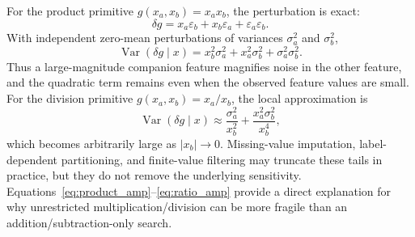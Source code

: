 \documentclass[preprint,12pt]{elsarticle}
\begin{document}
For the product primitive $g(x_a,x_b)=x_a x_b$, the perturbation is exact:
\begin{equation}
  \delta g=x_a\varepsilon_b+x_b\varepsilon_a+\varepsilon_a\varepsilon_b.
\end{equation}
With independent zero-mean perturbations of variances $\sigma_a^2$ and $\sigma_b^2$,
\begin{equation}
  \operatorname{Var}(\delta g\mid x)
  =x_b^2\sigma_a^2+x_a^2\sigma_b^2+\sigma_a^2\sigma_b^2.
  \label{eq:product_amp}
\end{equation}
Thus a large-magnitude companion feature magnifies noise in the other feature, and the quadratic term remains even when the observed feature values are small.  For the division primitive $g(x_a,x_b)=x_a/x_b$, the local approximation is
\begin{equation}
  \operatorname{Var}(\delta g\mid x)\approx
  \frac{\sigma_a^2}{x_b^2}+\frac{x_a^2\sigma_b^2}{x_b^4},
  \label{eq:ratio_amp}
\end{equation}
which becomes arbitrarily large as $|x_b|\rightarrow0$.  Missing-value imputation, label-dependent partitioning, and finite-value filtering may truncate these tails in practice, but they do not remove the underlying sensitivity.  Equations~\eqref{eq:product_amp}--\eqref{eq:ratio_amp} provide a direct explanation for why unrestricted multiplication/division can be more fragile than an addition/subtraction-only search.
\end{document}

